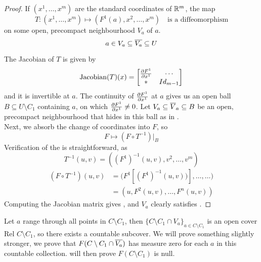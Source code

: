 \documentclass[../main-manifolds.tex]{subfiles}
\begin{document}
\begin{proof}
If $(x^1,\ldots,x^m)$ are the standard coordinates of ${\mathbb{R}^m}$, the map 
    \[
        T: (x^1,\ldots,x^m)\mapsto (F^1(a),x^2,\ldots,x^m)\quad\text{is a diffeomorphism}
    \]
    on some open, precompact neighbourhood $V_a$ of $a$.
    \[
        a\in V_a\subseteq \overline{V_a}\subseteq U
    \]
    
    The Jacobian of $T$ is given by
    \[
        \operatorname{Jacobian}(T)(x)=\begin{bmatrix}
            \pdv{F^1}{x^1}(x) & \cdots \\ * & Id_{m-1}
        \end{bmatrix}
    \]
    and it is invertible at $a$. The continuity of $\pdv{F^1}{x^1}$ at $a$ gives us an open ball $B\subseteq U\setminus C_1$ containing $a$, on which $\pdv{F^1}{x^1}\neq 0$. Let $V_a\subseteq\overline{V}_a\subseteq B$ be an open, precompact neighbourhood that hides in this ball as in . \\

    Next, we absorb the change of coordinates into $F$, so
    \[
        F\mapsto (F\circ T^{-1})|_{B}
    \]
    Verification of the  is straightforward, as
    \[
    T^{-1}(u,v) = ((F^1)^{-1}(u,v), v^2,\ldots,v^m)
    \]
    \begin{align*}
        (F\circ T^{-1})(u,v) 
        &= \biggl(F^1[(F^1)^{-1}(u,v))], \ldots,\ldots\biggr)\\
        &= (u, F^2(u,v),\ldots, F^n(u,v))
    \end{align*}
    Computing the Jacobian matrix gives , and $V_a$ clearly satisfies .
\end{proof}

Let $a$ range through all points in $C\setminus C_1$, then $\{C\setminus C_1\cap V_a\}_{a\in C\setminus C_1}$ is an open cover Rel $C\setminus C_1$, so there exists a countable subcover. We will prove something slightly stronger, we prove that $F(C\setminus C_1\cap \overline{V_a})$ has measure zero for each $a$ in this countable collection.  will then prove $F(C\setminus C_1)$ is null.\\
\end{document}
